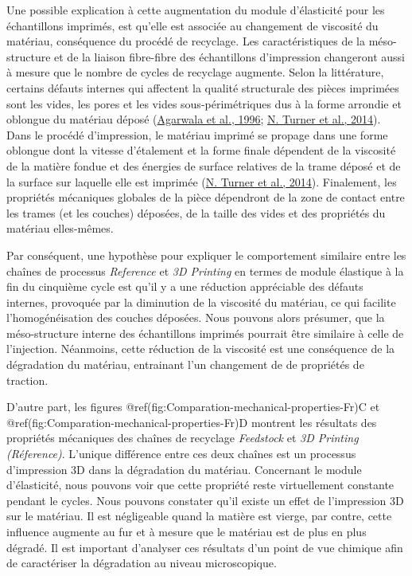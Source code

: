 \documentclass[
]{article}
\begin{document}
Une possible explication à cette augmentation du module d'élasticité
pour les échantillons imprimés, est qu'elle est associée au changement
de viscosité du matériau, conséquence du procédé de recyclage. Les
caractéristiques de la méso-structure et de la liaison fibre-fibre des
échantillons d'impression changeront aussi à mesure que le nombre de
cycles de recyclage augmente. Selon la littérature, certains défauts
internes qui affectent la qualité structurale des pièces imprimées sont
les vides, les pores et les vides sous-périmétriques dus à la forme
arrondie et oblongue du matériau déposé
(\protect\hyperlink{ref-Agarwala1996}{Agarwala et al., 1996};
\protect\hyperlink{ref-NTurner2014}{N. Turner et al., 2014}). Dans le
procédé d'impression, le matériau imprimé se propage dans une forme
oblongue dont la vitesse d'étalement et la forme finale dépendent de la
viscosité de la matière fondue et des énergies de surface relatives de
la trame déposé et de la surface sur laquelle elle est imprimée
(\protect\hyperlink{ref-NTurner2014}{N. Turner et al., 2014}).
Finalement, les propriétés mécaniques globales de la pièce dépendront de
la zone de contact entre les trames (et les couches) déposées, de la
taille des vides et des propriétés du matériau elles-mêmes.

Par conséquent, une hypothèse pour expliquer le comportement similaire
entre les chaînes de processus \emph{Reference} et \emph{3D Printing} en
termes de module élastique à la fin du cinquième cycle est qu'il y a une
réduction appréciable des défauts internes, provoquée par la diminution
de la viscosité du matériau, ce qui facilite l'homogénéisation des
couches déposées. Nous pouvons alors présumer, que la méso-structure
interne des échantillons imprimés pourrait être similaire à celle de
l'injection. Néanmoins, cette réduction de la viscosité est une
conséquence de la dégradation du matériau, entrainant l'un changement de
de propriétés de traction.

D'autre part, les figures
@ref(fig:Comparation-mechanical-properties-Fr)C et
@ref(fig:Comparation-mechanical-properties-Fr)D montrent les résultats
des propriétés mécaniques des chaînes de recyclage \emph{Feedstock} et
\emph{3D Printing (Réference)}. L'unique différence entre ces deux
chaînes est un processus d'impression 3D dans la dégradation du
matériau. Concernant le module d'élasticité, nous pouvons voir que cette
propriété reste virtuellement constante pendant le cycles. Nous pouvons
constater qu'il existe un effet de l'impression 3D sur le matériau. Il
est négligeable quand la matière est vierge, par contre, cette influence
augmente au fur et à mesure que le matériau est de plus en plus dégradé.
Il est important d'analyser ces résultats d'un point de vue chimique
afin de caractériser la dégradation au niveau microscopique.
\end{document}
